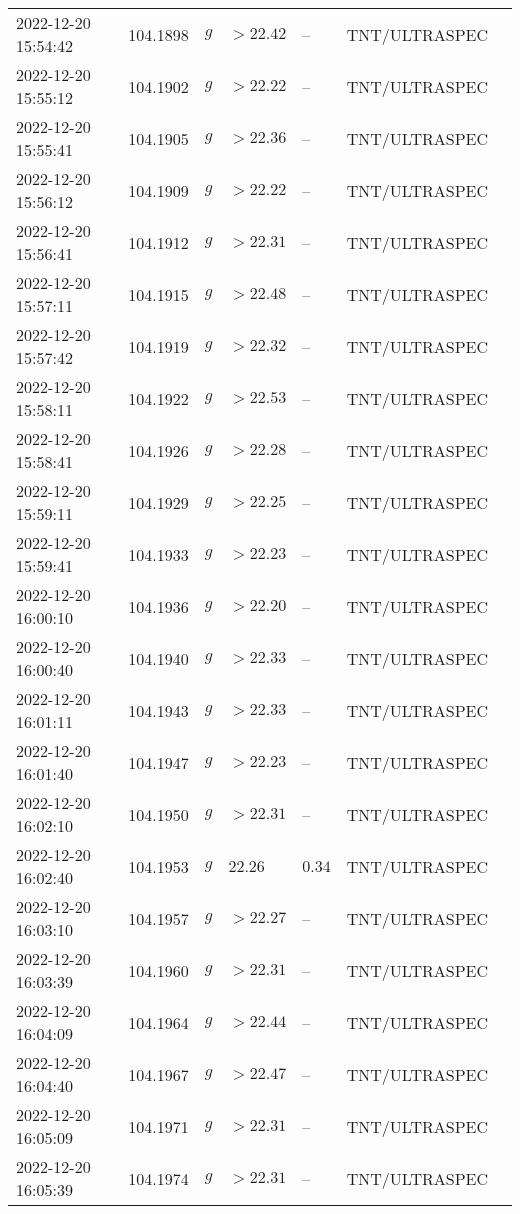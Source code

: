 \documentclass{nature_plusfigure}
\begin{document}
\begin{supplement}
\begin{center}
\begin{longtable}{lllllll}
2022-12-20 15:54:42 & 104.1898 & $g$ & $>22.42$ & -- & TNT/ULTRASPEC &  \\ 
2022-12-20 15:55:12 & 104.1902 & $g$ & $>22.22$ & -- & TNT/ULTRASPEC &  \\ 
2022-12-20 15:55:41 & 104.1905 & $g$ & $>22.36$ & -- & TNT/ULTRASPEC &  \\ 
2022-12-20 15:56:12 & 104.1909 & $g$ & $>22.22$ & -- & TNT/ULTRASPEC &  \\ 
2022-12-20 15:56:41 & 104.1912 & $g$ & $>22.31$ & -- & TNT/ULTRASPEC &  \\ 
2022-12-20 15:57:11 & 104.1915 & $g$ & $>22.48$ & -- & TNT/ULTRASPEC &  \\ 
2022-12-20 15:57:42 & 104.1919 & $g$ & $>22.32$ & -- & TNT/ULTRASPEC &  \\ 
2022-12-20 15:58:11 & 104.1922 & $g$ & $>22.53$ & -- & TNT/ULTRASPEC &  \\ 
2022-12-20 15:58:41 & 104.1926 & $g$ & $>22.28$ & -- & TNT/ULTRASPEC &  \\ 
2022-12-20 15:59:11 & 104.1929 & $g$ & $>22.25$ & -- & TNT/ULTRASPEC &  \\ 
2022-12-20 15:59:41 & 104.1933 & $g$ & $>22.23$ & -- & TNT/ULTRASPEC &  \\ 
2022-12-20 16:00:10 & 104.1936 & $g$ & $>22.20$ & -- & TNT/ULTRASPEC &  \\ 
2022-12-20 16:00:40 & 104.1940 & $g$ & $>22.33$ & -- & TNT/ULTRASPEC &  \\ 
2022-12-20 16:01:11 & 104.1943 & $g$ & $>22.33$ & -- & TNT/ULTRASPEC &  \\ 
2022-12-20 16:01:40 & 104.1947 & $g$ & $>22.23$ & -- & TNT/ULTRASPEC &  \\ 
2022-12-20 16:02:10 & 104.1950 & $g$ & $>22.31$ & -- & TNT/ULTRASPEC &  \\ 
2022-12-20 16:02:40 & 104.1953 & $g$ & $22.26$ & $0.34$ & TNT/ULTRASPEC &  \\ 
2022-12-20 16:03:10 & 104.1957 & $g$ & $>22.27$ & -- & TNT/ULTRASPEC &  \\ 
2022-12-20 16:03:39 & 104.1960 & $g$ & $>22.31$ & -- & TNT/ULTRASPEC &  \\ 
2022-12-20 16:04:09 & 104.1964 & $g$ & $>22.44$ & -- & TNT/ULTRASPEC &  \\ 
2022-12-20 16:04:40 & 104.1967 & $g$ & $>22.47$ & -- & TNT/ULTRASPEC &  \\ 
2022-12-20 16:05:09 & 104.1971 & $g$ & $>22.31$ & -- & TNT/ULTRASPEC &  \\ 
2022-12-20 16:05:39 & 104.1974 & $g$ & $>22.31$ & -- & TNT/ULTRASPEC &  \\ 

\end{longtable}
\end{center}
\end{supplement}
\end{document}

